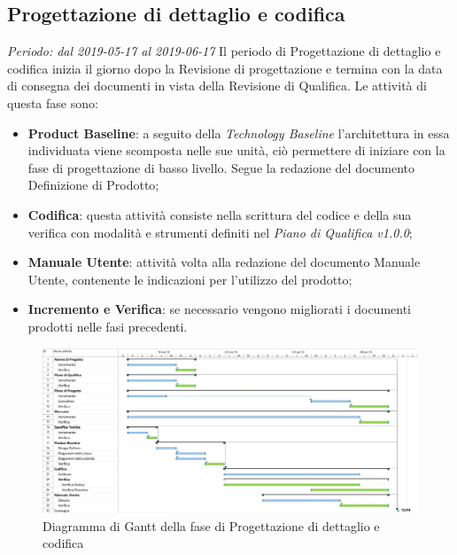 \subsection{Progettazione di dettaglio e codifica}
\textit{Periodo: dal 2019-05-17 al 2019-06-17}
Il periodo di Progettazione di dettaglio e codifica inizia il giorno dopo la Revisione di progettazione e termina con la data di consegna dei documenti 
in vista della Revisione di Qualifica. Le attività di questa fase sono:
\begin{itemize}
	\item \textbf{Product Baseline}: a seguito della \textit{Technology 
	Baseline} l'architettura in essa individuata viene scomposta nelle sue unità, ciò permettere di iniziare con la fase di progettazione di basso livello. Segue la redazione del documento Definizione di Prodotto;
	\item \textbf{Codifica}: questa attività consiste nella scrittura del 
	codice e della sua verifica con modalità e strumenti definiti nel 
	\textit{Piano di Qualifica v1.0.0};
	\item \textbf{Manuale Utente}: attività volta alla redazione del documento Manuale Utente, contenente le indicazioni per l'utilizzo del prodotto;
	\item \textbf{Incremento e Verifica}: se necessario vengono migliorati i 
	documenti prodotti nelle fasi precedenti.
\end{itemize}

\begin{figure}[H]
	\includegraphics[width=0.99\linewidth]{res/images/gantt_pd.jpg}
	\caption{Diagramma di Gantt della fase di Progettazione di dettaglio e codifica}
\end{figure}
\pagebreak


